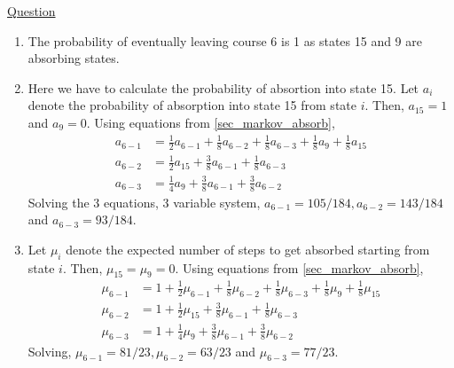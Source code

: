\documentclass[11pt, a4paper]{article}
\begin{document}
\begin{enumerate}
        \hypertarget{a_markovcourse}{\item} \hyperlink{q_markovcourse}{Question}\newline
        \begin{enumerate}
            \item The probability of eventually leaving course 6 is 1 as states 15 and 9 are absorbing states.
            \item \label{itm:a_markovcourse_2} Here we have to calculate the probability of absortion into state 15. Let $a_{i}$ denote the probability of absorption into state 15 from state $i$. Then, $a_{15} = 1$ and $a_{9} = 0$. Using equations from \ref{sec_markov_absorb},
            \begin{align*}
                a_{6-1} &= \frac{1}{2}a_{6-1} + \frac{1}{8} a_{6-2} + \frac{1}{8} a_{6-3} + \frac{1}{8}a_{9} + \frac{1}{8}a_{15}\\
                a_{6-2} &= \frac{1}{2}a_{15} + \frac{3}{8}a_{6-1} + \frac{1}{8}a_{6-3}\\
                a_{6-3} &= \frac{1}{4}a_{9} + \frac{3}{8}a_{6-1} + \frac{3}{8}a_{6-2}
            \end{align*}
            Solving the 3 equations, 3 variable system, $a_{6-1} = 105/184, a_{6-2} = 143/184$ and $a_{6-3} = 93/184$.
            \item Let $\mu_{i}$ denote the expected number of steps to get absorbed starting from state $i$. Then, $\mu_{15} = \mu_{9} = 0$. Using equations from \ref{sec_markov_absorb},
            \begin{align*}
                \mu_{6-1} &= 1 + \frac{1}{2}\mu_{6-1} + \frac{1}{8} \mu_{6-2} + \frac{1}{8} \mu_{6-3} + \frac{1}{8}\mu_{9} + \frac{1}{8}\mu_{15}\\
                \mu_{6-2} &= 1 + \frac{1}{2}\mu_{15} + \frac{3}{8}\mu_{6-1} + \frac{1}{8}\mu_{6-3}\\
                \mu_{6-3} &= 1 + \frac{1}{4}\mu_{9} + \frac{3}{8}\mu_{6-1} + \frac{3}{8}\mu_{6-2}                
            \end{align*}
            Solving, $\mu_{6-1} = 81/23, \mu_{6-2} = 63/23$ and $\mu_{6-3} = 77/23$.


\end{enumerate}
\end{enumerate}
\end{document}
